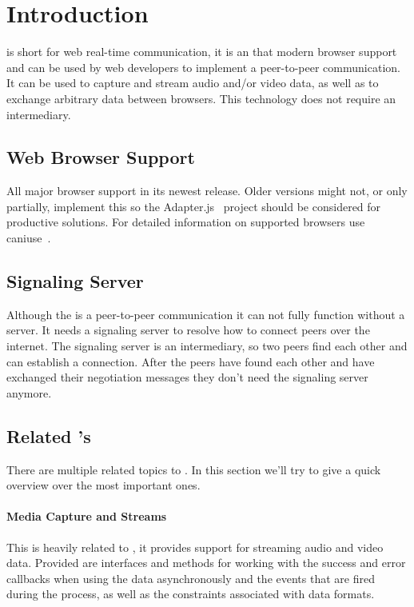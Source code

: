 \clearpage
\chapter{Introduction}
 is short for web real-time communication, it is an  that modern browser support and can be used by web developers to implement a peer-to-peer communication. It can be used to capture and stream audio and/or video data, as well as to exchange arbitrary data between browsers. This technology does not require an intermediary.

\section{Web Browser Support}
All major browser support  in its newest release. Older versions might not, or only partially, implement this  so the Adapter.js~\autocite{adapterjs} project should be considered for productive solutions. For detailed information on supported browsers use caniuse~\autocite{caniuse}.

\section{Signaling Server}
Although the  is a peer-to-peer communication  it can not fully function without a server. It needs a signaling server to resolve how to connect peers over the internet. The signaling server is an intermediary, so two peers find each other and can establish a connection. After the peers have found each other and have exchanged their negotiation messages they don't need the signaling server anymore.

\section{Related 's}
There are multiple related topics to . In this section we'll try to give a quick overview over the most important ones.

\subsubsection{Media Capture and Streams }
This  is heavily related to , it provides support for streaming audio and video data. Provided are interfaces and methods for working with the success and error callbacks when using the data asynchronously and the events that are fired during the process, as well as the constraints associated with data formats.